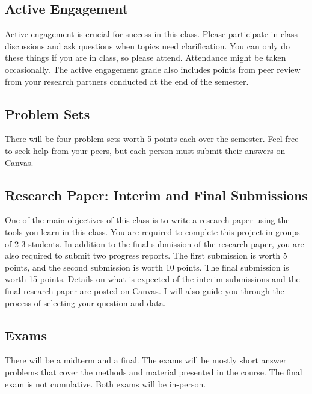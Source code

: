 \documentclass{syllabus}
\begin{document}
\subsection*{Active Engagement}
Active engagement is crucial for success in this class. Please participate in class discussions and ask questions when topics need clarification. You can only do these things if you are in class, so please attend. Attendance might be taken occasionally. The active engagement grade also includes points from peer review from your research partners conducted at the end of the semester.

\subsection*{Problem Sets}
There will be four problem sets worth 5 points each over the semester. Feel free to seek help from your peers, but each person must submit their answers on Canvas.

\subsection*{Research Paper: Interim and Final Submissions}
One of the main objectives of this class is to write a research paper using the tools you learn in this class. You are required to complete this project in groups of 2-3 students. In addition to the final submission of the research paper, you are also required to submit two progress reports. The first submission is worth 5 points, and the second submission is worth 10 points. The final submission is worth 15 points. Details on what is expected of the interim submissions and the final research paper are posted on Canvas. I will also guide you through the process of selecting your question and data.

\subsection*{Exams}
There will be a midterm and a final. The exams will be mostly short answer problems that cover the methods and material presented in the course. The final exam is not cumulative. Both exams will be in-person.

\end{document}
